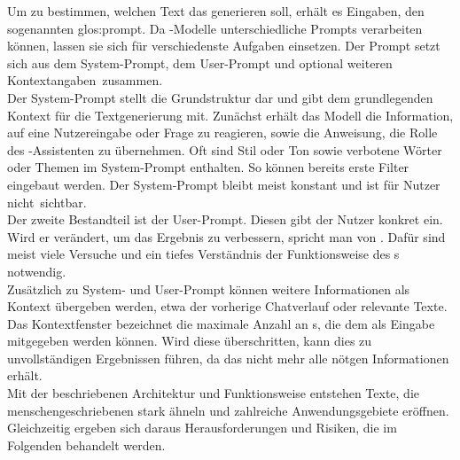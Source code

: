 \documentclass[../main.tex]{subfiles}
\begin{document}
Um zu bestimmen, welchen Text das  generieren soll, erhält es Eingaben, den sogenannten \gls{glos:prompt}. Da -Modelle unterschiedliche Prompts  
verarbeiten können, lassen sie sich für verschiedenste Aufgaben einsetzen. Der Prompt setzt sich aus dem System-Prompt, dem User-Prompt und optional weiteren \mbox{Kontextangaben zusammen.\cite{systemprompt}}\\
Der System-Prompt stellt die Grundstruktur dar und gibt dem  grundlegenden Kontext für die Textgenerierung mit. 
Zunächst erhält das Modell die Information, auf eine Nutzereingabe oder Frage zu reagieren, sowie die Anweisung, die Rolle des -Assistenten zu übernehmen.
Oft sind Stil oder Ton sowie verbotene Wörter oder Themen im System-Prompt 
enthalten. So können bereits erste Filter eingebaut werden.\cite{systemprompt} 
Der System-Prompt bleibt meist konstant und ist für Nutzer \mbox{nicht sichtbar.}\\
Der zweite Bestandteil ist der User-Prompt. Diesen gibt der Nutzer konkret ein. Wird er verändert, um das Ergebnis zu verbessern, spricht man von  . 
Dafür sind meist viele Versuche und ein tiefes Verständnis der Funktionsweise des s notwendig. \cite{promptengineering}\\
Zusätzlich zu System- und User-Prompt können weitere Informationen als Kontext übergeben werden, etwa der vorherige Chatverlauf oder relevante Texte. 
Das Kontextfenster bezeichnet die maximale Anzahl an s, die dem  als Eingabe mitgegeben werden können. Wird diese überschritten, kann dies zu unvollständigen 
Ergebnissen führen, da das  nicht mehr alle nötgen Informationen erhält.\\
Mit der beschriebenen Architektur und Funktionsweise entstehen Texte, die menschengeschriebenen stark ähneln und zahlreiche Anwendungsgebiete eröffnen. Gleichzeitig ergeben sich daraus Herausforderungen und Risiken, 
die im Folgenden behandelt werden.
\end{document}
